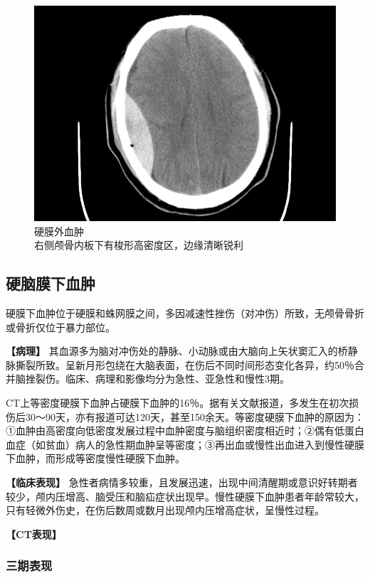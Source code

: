 \begin{figure}[!htbp]
 \centering
 \includegraphics[width=.7\textwidth,height=\textheight,keepaspectratio]{./images/Image00049.jpg}
 \captionsetup{justification=centering}
 \caption{硬膜外血肿\\{\small 右侧颅骨内板下有梭形高密度区，边缘清晰锐利}}
 \label{fig2-30}
  \end{figure} 

\subsection{硬脑膜下血肿}

硬膜下血肿位于硬膜和蛛网膜之间，多因减速性挫伤（对冲伤）所致，无颅骨骨折或骨折仅位于暴力部位。

\textbf{【病理】}
其血源多为脑对冲伤处的静脉、小动脉或由大脑向上矢状窦汇入的桥静脉撕裂所致。呈新月形包绕在大脑表面，在伤后不同时间形态变化各异，约50％合并脑挫裂伤。临床、病理和影像均分为急性、亚急性和慢性3期。

CT上等密度硬膜下血肿占硬膜下血肿的16％。据有关文献报道，多发生在初次损伤后30～90天，亦有报道可达120天，甚至150余天。等密度硬膜下血肿的原因为：①血肿由高密度向低密度发展过程中血肿密度与脑组织密度相近时；②偶有低蛋白血症（如贫血）病人的急性期血肿呈等密度；③再出血或慢性出血进入到慢性硬膜下血肿，而形成等密度慢性硬膜下血肿。

\textbf{【临床表现】}
急性者病情多较重，且发展迅速，出现中间清醒期或意识好转期者较少，颅内压增高、脑受压和脑疝症状出现早。慢性硬膜下血肿患者年龄常较大，只有轻微外伤史，在伤后数周或数月出现颅内压增高症状，呈慢性过程。

\textbf{【CT表现】}

\subsubsection{三期表现}

